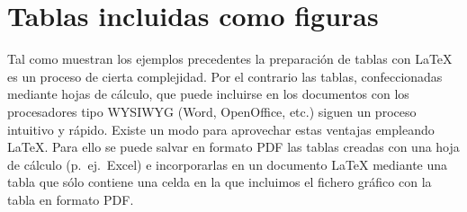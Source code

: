 \documentclass[ 		%
	11pt,				%
	a4paper,			%
	twoside,			%
	openright,			%
	final       		%
]{book}
\begin{document}
\begin{table}[H]
	\centering
	\caption{Tabla escalada}
	\label{tab:escalada}
\end{table}




\section{Tablas incluidas como figuras}
Tal como muestran los ejemplos precedentes la preparación de tablas con \LaTeX{} es un proceso de cierta complejidad. Por el contrario las tablas, confeccionadas mediante hojas de cálculo, que puede incluirse en los documentos con los procesadores tipo \textsc{WYSIWYG} (\textsf{Word}, \textsf{OpenOffice}, etc.) siguen un proceso intuitivo y rápido. Existe un modo para aprovechar estas ventajas empleando \LaTeX{}. Para ello se puede salvar en formato \textsf{PDF} las tablas creadas con una hoja de cálculo (p.~ej.\ \textsf{Excel}) e incorporarlas en un documento \LaTeX{} mediante una tabla que sólo contiene una celda en la que incluimos el fichero gráfico con la tabla en formato \textsf{PDF}. 
\end{document}
